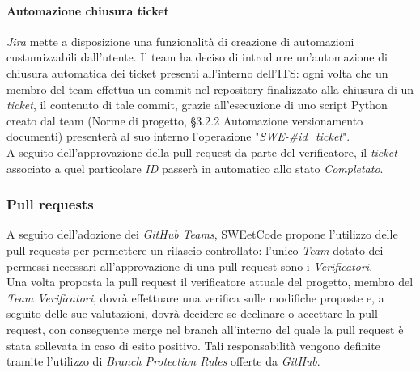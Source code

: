 \documentclass[10pt, a4paper]{article}
\begin{document}
\paragraph{Automazione chiusura ticket} \textit{Jira} mette a disposizione una funzionalità di creazione di automazioni custumizzabili dall'utente.
Il team ha deciso di introdurre un'automazione di chiusura automatica dei ticket presenti all'interno dell'ITS: ogni volta che un membro del team 
effettua un commit nel repository finalizzato alla chiusura di un \textit{ticket}, il contenuto di tale commit, grazie all'esecuzione di uno script Python creato dal team (Norme di progetto, \S 3.2.2 Automazione versionamento documenti)
presenterà al suo interno l'operazione "\textit{SWE-\#id\_ticket}".\\
A seguito dell'approvazione della pull request da parte del verificatore, il \textit{ticket} associato a quel particolare \textit{ID} passerà in automatico
allo stato \textit{Completato}.

\subsubsection{Pull requests} %
\label{sec:pull_request}
A seguito dell'adozione dei \textit{GitHub Teams}, SWEetCode propone l'utilizzo delle pull requests per permettere un rilascio controllato: l'unico \textit{Team} dotato dei permessi necessari all'approvazione di una pull request sono i \textit{Verificatori}.\\
Una volta proposta la pull request il verificatore attuale del progetto, membro del \textit{Team Verificatori}, dovrà effettuare una verifica sulle modifiche proposte e, a seguito delle sue valutazioni, dovrà decidere se declinare o accettare la pull request, con conseguente merge nel branch all'interno del quale la pull request è stata sollevata in caso di esito positivo.
Tali responsabilità vengono definite tramite l'utilizzo di \textit{Branch Protection Rules} offerte da \textit{GitHub}.
\end{document}
